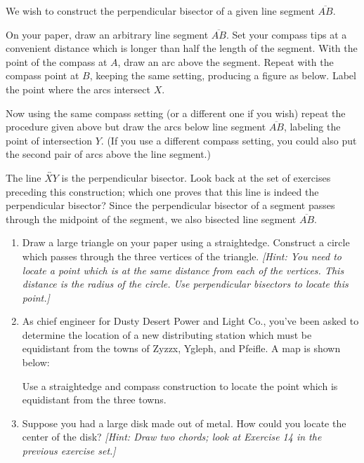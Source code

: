 \documentclass[12pt]{book} %
\begin{document}
We wish to construct the perpendicular bisector of a given line segment $\overline{AB}$.

On your paper, draw an arbitrary line segment $\overline{AB}$. Set your compass tips at a convenient distance which is longer than half the length of the segment. With the point of the compass at $A$, draw an arc above the segment. Repeat with the compass point at $B$, keeping the same setting, producing a figure as below. Label the point where the arcs intersect $X$.


Now using the same compass setting (or a different one if you wish) repeat the procedure given above but draw the arcs below line segment $\overline{AB}$, labeling the point of intersection $Y$. (If you use a different compass setting, you could also put the second pair of arcs above the line segment.)


The line $\overleftrightarrow{XY}$ is the perpendicular bisector. Look back at the set of exercises preceding this construction; which one proves that this line is indeed the perpendicular bisector? Since the perpendicular bisector of a segment passes through the midpoint of the segment, we also bisected line segment $\overline{AB}$.

\begin{enumerate}
\item Draw a large triangle on your paper using a straightedge. Construct a circle which passes through the three vertices of the triangle. \textit{[Hint: You need to locate a point which is at the same distance from each of the vertices. This distance is the radius of the circle. Use perpendicular bisectors to locate this point.]}

\item As chief engineer for Dusty Desert Power and Light Co., you've been asked to determine the location of a new distributing station which must be equidistant from the towns of Zyzzx, Ygleph, and Pfeifle. A map is shown below:


Use a straightedge and compass construction to locate the point which is equidistant from the three towns.

\item Suppose you had a large disk made out of metal. How could you locate the center of the disk? \textit{[Hint: Draw two chords; look at Exercise 14 in the previous exercise set.]}
\end{enumerate}
\end{document}
